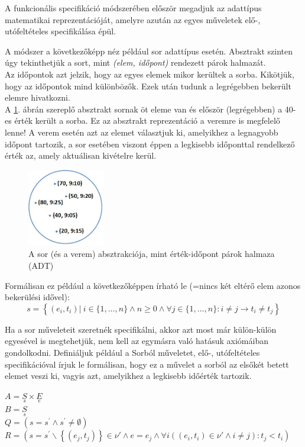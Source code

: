 \documentclass[12pt,margin=0px]{article}
\begin{document}
    A funkcionális specifikáció módszerében először megadjuk az adattípus matematikai reprezentációját, amelyre azután az egyes műveletek elő-, utófeltételes specifikálása épül.\\

    {\footnotesize \noindent {\color{blue} \faLightbulbO\ $\triangleright$ } }

    {\footnotesize
    A módszer a következőképp néz például sor adattípus esetén. Absztrakt szinten úgy tekinthetjük a sort, mint \emph{(elem, időpont)} rendezett párok halmazát.\\

    Az időpontok azt jelzik, hogy az egyes elemek mikor kerültek a sorba. Kikötjük, hogy az időpontok mind különbözők. Ezek után tudunk a legrégebben bekerült elemre hivatkozni.\\

    A \ref{fig:queueabs}. ábrán szereplő absztrakt sornak öt eleme van és először (legrégebben) a 40-es érték került a sorba. Ez az absztrakt reprezentáció a veremre is megfelelő lenne! A verem esetén azt az elemet választjuk ki, amelyikhez a legnagyobb időpont tartozik, a sor esetében viszont éppen a legkisebb időponttal rendelkező érték az, amely aktuálisan kivételre kerül.\\

	\begin{figure}[H]
		\centering
		\includegraphics[width=0.3\textwidth]{img/queue_abs.png}
		\caption{A sor (és a verem) absztrakciója, mint érték-időpont párok halmaza (ADT)}
        \label{fig:queueabs}
	\end{figure}

    \noindent Formálisan ez például a következőképpen írható le (=nincs két eltérő elem azonos bekerülési idővel):
    \[
        s = \left\{ (e_i, t_i)|\ i \in \{1, \ldots, n\} \wedge n \geq 0 \wedge \forall j \in \{ 1, \ldots, n\}: i \neq j \rightarrow t_i \neq t_j \right\}
    \]

    \noindent Ha a sor műveleteit szeretnék specifikálni, akkor azt most már külön-külön egyesével is megtehetjük, nem kell az egymásra való hatásuk axiómáiban gondolkodni. Definiáljuk például a Sorból műveletet, elő-, utófeltételes specifikációval írjuk le formálisan, hogy ez a művelet a sorból az elsőkét betett elemet veszi ki, vagyis azt, amelyikhez a legkisebb időérték tartozik.

    \noindent $A = \underset{s}{S} \times \underset{e}{E}$\\
    \noindent $B = \underset{s}{S}$\\
    \noindent $Q = (s = s^{'} \wedge s^{'} \neq \emptyset)$\\
    \noindent $R = (s = s^{'}\backslash \left\{(e_{j}, t_{j}) \right\} \in \nu' \wedge e = e_{j} \wedge \forall i((e_{i}, t_{i}) \in \nu' \wedge i \neq j): t_{j} < t_{i})$\\
    }
\end{document}
